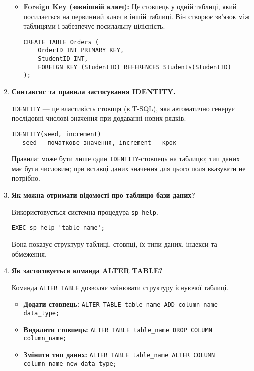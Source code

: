 \documentclass{article}
\begin{document}
\begin{enumerate}[label=\arabic*., leftmargin=*]
\begin{itemize}
            \item \textbf{Foreign Key (зовнішній ключ):} Це стовпець у одній таблиці, який посилається на первинний ключ в іншій таблиці. Він створює зв'язок між таблицями і забезпечує посилальну цілісність.
            \begin{CodeBox}
            \begin{verbatim}
CREATE TABLE Orders (
    OrderID INT PRIMARY KEY,
    StudentID INT,
    FOREIGN KEY (StudentID) REFERENCES Students(StudentID)
);
            \end{verbatim}
            \end{CodeBox}
        \end{itemize}

        \item \textbf{Синтаксис та правила застосування IDENTITY.}

        \texttt{IDENTITY} — це властивість стовпця (в T-SQL), яка автоматично генерує послідовні числові значення при додаванні нових рядків.
        \begin{CodeBox}[Синтаксис]
        \begin{verbatim}
IDENTITY(seed, increment)
-- seed - початкове значення, increment - крок
        \end{verbatim}
        \end{CodeBox}
        Правила: може бути лише один \texttt{IDENTITY}-стовпець на таблицю; тип даних має бути числовим; при вставці даних значення для цього поля вказувати не потрібно.

        \item \textbf{Як можна отримати відомості про таблицю бази даних?}

        Використовується системна процедура \texttt{sp\_help}.
        \begin{CodeBox}[SQL]
        \begin{verbatim}
EXEC sp_help 'table_name';
        \end{verbatim}
        \end{CodeBox}
        Вона показує структуру таблиці, стовпці, їх типи даних, індекси та обмеження.

        \item \textbf{Як застосовується команда ALTER TABLE?}

        Команда \texttt{ALTER TABLE} дозволяє змінювати структуру існуючої таблиці.
        \begin{itemize}
            \item \textbf{Додати стовпець:} \texttt{ALTER TABLE table\_name ADD column\_name data\_type;}
            \item \textbf{Видалити стовпець:} \texttt{ALTER TABLE table\_name DROP COLUMN column\_name;}
            \item \textbf{Змінити тип даних:} \texttt{ALTER TABLE table\_name ALTER COLUMN column\_name new\_data\_type;}
        \end{itemize}
        

\end{enumerate}
\end{document}
